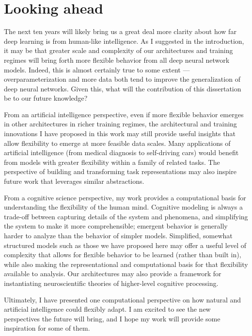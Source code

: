 \section{Looking ahead}

The next ten years will likely bring us a great deal more clarity about how far deep learning is from human-like intelligence. As I suggested in the introduction, it may be that greater scale and complexity of our architectures and training regimes will bring forth more flexible behavior from all deep neural network models. Indeed, this is almost certainly true to some extent --- overparameterization and more data both tend to improve the generalization of deep neural networks. Given this, what will the contribution of this dissertation be to our future knowledge? \par 

From an artificial intelligence perspective, even if more flexible behavior emerges in other architectures in richer training regimes, the architectural and training innovations I have proposed in this work may still provide useful insights that allow flexibility to emerge at more feasible data scales. Many applications of artificial intelligence (from medical diagnosis to self-driving cars) would benefit from models with greater flexibility within a family of related tasks. The perspective of building and transforming task representations may also inspire future work that leverages similar abstractions. \par 

From a cognitive science perspective, my work provides a computational basis for understanding the flexibility of the human mind. Cognitive modeling is always a trade-off between capturing details of the system and phenomena, and simplifying the system to make it more comprehensible; emergent behavior is generally harder to analyze than the behavior of simpler models. Simplified, somewhat structured models such as those we have proposed here may offer a useful level of complexity that allows for flexible behavior to be learned (rather than built in), while also making the representational and computational basis for that flexibility available to analysis. Our architectures may also provide a framework for instantiating neuroscientific theories of higher-level cognitive processing. \par 

Ultimately, I have presented one computational perspective on how natural and artificial intelligence could flexibly adapt. I am excited to see the new perspectives the future will bring, and I hope my work will provide some inspiration for some of them. 
